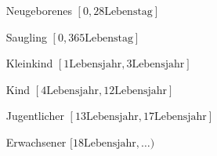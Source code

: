 \begin{itemize}
	\item[Neugeborenes] $[0, 28 \text{Lebenstag}]$
	\item[Saugling] $[0,365 \text{Lebenstag}]$
	\item[Kleinkind] $[1 \text{Lebensjahr}, 3 \text{Lebensjahr}]$
	\item[Kind] $[4 \text{Lebensjahr}, 12 \text{Lebensjahr}]$
	\item[Jugentlicher] $[13 \text{Lebensjahr}, 17 \text{Lebensjahr}]$
	\item[Erwachsener] $[18 \text{Lebensjahr}, \dots )$
\end{itemize}



